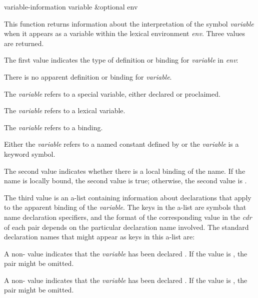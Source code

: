 \begin{defun}[Function]
variable-information variable &optional env

  This function returns information about the interpretation of the symbol
  \emph{variable} when it appears as a variable within the lexical environment \emph{env}.
  Three values are returned.

  The first value indicates the type of definition or binding for \emph{variable}
  in \emph{env\/}:
\begin{indentdesc}{7pc}
\item[\cdf{nil}]
There is no apparent definition or binding for \emph{variable}.

\item[\cd{:special}]
The \emph{variable} refers to a special variable, either declared or proclaimed. 

\item[\cd{:lexical}]
The \emph{variable} refers to a lexical variable.

\item[\cd{:symbol-macro}]
The \emph{variable} refers to a  binding.

\item[\cd{:constant}]
Either the \emph{variable} refers to a named constant defined by
 or the \emph{variable} is a keyword symbol.
\end{indentdesc}

  The second value indicates whether there is a local binding of the name.  If
  the name is locally bound, the second value is true; otherwise, the second value
  is .

  The third value is an a-list containing information about declarations
  that apply to the apparent binding of the \emph{variable}.  The keys in the a-list
  are symbols that name declaration specifiers, and the format of the
  corresponding value in the \emph{cdr} of each pair depends on the particular 
  declaration name involved.  The standard declaration names
  that might appear as keys in this a-list are:
\begin{indentdesc}{7pc}
\item[\cdf{dynamic-extent}]
A non- value indicates that the \emph{variable} has been
                declared . If the value is , the pair
                might be omitted.

\item[\cdf{ignore}]
A non- value indicates that the \emph{variable} has been declared
                . If the value is , the pair might be omitted.


\end{indentdesc}
\end{defun}
